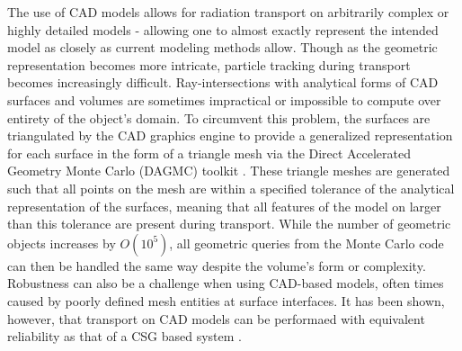 \documentclass[12pt, a4paper]{article}
\begin{document}
The use of CAD models allows for radiation transport on arbitrarily complex or highly detailed models - allowing one to almost exactly represent the intended model as closely as current modeling methods allow. Though as the geometric representation becomes more intricate, particle tracking during transport becomes increasingly difficult. Ray-intersections with analytical forms of CAD surfaces and volumes are sometimes impractical or impossible to compute over entirety of the object's domain. To circumvent this problem, the surfaces are triangulated by the CAD graphics engine to provide a generalized representation for each surface in the form of a triangle mesh via the Direct Accelerated Geometry Monte Carlo (DAGMC) toolkit \cite{Tautges_2009}. These triangle meshes are generated such that all points on the mesh are within a specified tolerance of the analytical representation of the surfaces, meaning that all features of the model on larger than this tolerance are present during transport. While the number of geometric objects increases by $O(10^5)$, all geometric queries from the Monte Carlo code can then be handled the same way despite the volume's form or complexity. Robustness can also be a challenge when using CAD-based models, often times caused by poorly defined mesh entities at surface interfaces. It has been shown, however, that transport on CAD models can be performaed with equivalent reliability as that of a CSG based system \cite{Smith_2011}.
\end{document}
